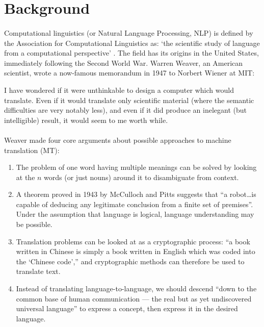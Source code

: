 \section*{Background}

\paragraph{}{Computational linguistics (or Natural Language
  Processing, NLP) is defined by the Association for Computational
  Linguistics as: `the scientific study of language from a
  computational perspective' \cite{acl-def}. The field has its origins
  in the United States, immediately following the Second World
  War. Warren Weaver, an American scientist, wrote a now-famous
  memorandum \cite{weaver} in 1947 to Norbert Wiener at MIT: }
\begin{displayquote}
  I have wondered if it were unthinkable to design a computer which
  would translate. Even if it would translate only scientific material
  (where the semantic difficulties are very notably less), and even if
  it did produce an inelegant (but intelligible) result, it would seem
  to me worth while.
\end{displayquote}
\paragraph{}{Weaver made four core arguments about possible approaches
  to machine translation (MT)\cite{core}:}
\begin{enumerate}
\item The problem of one word having multiple meanings can be solved
  by looking at the $n$ words (or just nouns) around it to
  disambiguate from context.

\item A theorem proved in 1943 by McCulloch and Pitts \cite{pitts}
  suggests that ``a robot\ldots is capable of deducing any legitimate
  conclusion from a finite set of premises''. Under the assumption
  that language is logical, language understanding may be possible.

\item Translation problems can be looked at as a cryptographic
  process: ``a book written in Chinese is simply a book written in
  English which was coded into the `Chinese code','' and cryptographic
  methods can therefore be used to translate text.

\item Instead of translating language-to-language, we should descend
  ``down to the common base of human communication --- the real but as
  yet undiscovered universal language'' to express a concept, then
  express it in the desired language.
\end{enumerate}

